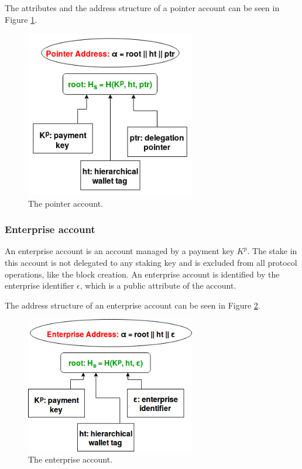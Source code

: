 The attributes and the address structure of a pointer account can be seen in Figure \ref{fig:pointer_account}.

\begin{figure}
  \begin{center}
    \includegraphics[width=210pt]{figures/pointer_account.png}
  \end{center}
  \caption{The pointer account.}
  \label{fig:pointer_account}
\end{figure}

\subsubsection{Enterprise account}\label{subsubsec:enterprise_account_plain}

An enterprise account is an account managed by a payment key $K^p$. The stake in this account is not delegated to any staking key and is excluded from all protocol operations, like the block creation. An enterprise account is identified by the enterprise identifier $\epsilon$, which is a public attribute of the account.

The address structure of an enterprise account can be seen in Figure \ref{fig:enterprise_account_plain}.

\begin{figure}
  \begin{center}
    \includegraphics[width=210pt]{figures/enterprise_account_plain.png}
  \end{center}
  \caption{The enterprise account.}
  \label{fig:enterprise_account_plain}
\end{figure}
